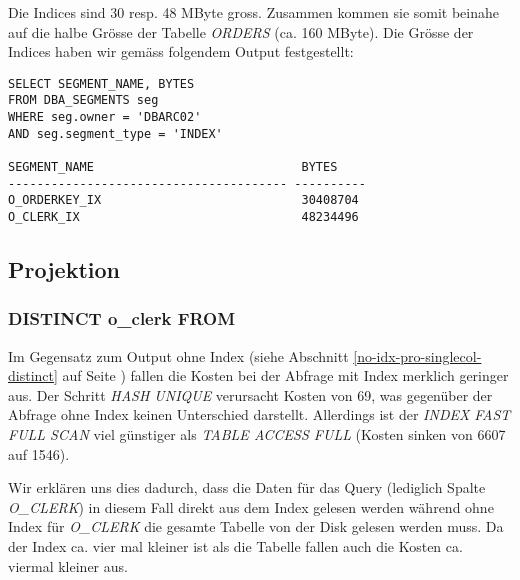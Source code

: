 \documentclass[11pt,a4paper,parskip=half]{scrartcl}
\begin{document}
Die Indices sind 30 resp. 48 MByte gross. Zusammen kommen sie somit beinahe auf die halbe Grösse der Tabelle \emph{ORDERS} (ca. 160 MByte). Die Grösse der Indices haben wir gemäss folgendem Output festgestellt:
\begin{lstlisting}
SELECT SEGMENT_NAME, BYTES
FROM DBA_SEGMENTS seg
WHERE seg.owner = 'DBARC02'
AND seg.segment_type = 'INDEX'

SEGMENT_NAME                             BYTES
--------------------------------------- ----------
O_ORDERKEY_IX                            30408704 
O_CLERK_IX                               48234496 
\end{lstlisting}

\subsection{Projektion}
\subsubsection{DISTINCT o\_clerk FROM}
\label{idx-pro-singlecol-distinct}
Im Gegensatz zum Output ohne Index (siehe Abschnitt \ref{no-idx-pro-singlecol-distinct} auf Seite \pageref{no-idx-pro-singlecol-distinct}) fallen die Kosten bei der Abfrage mit Index merklich geringer aus. Der Schritt \emph{HASH UNIQUE} verursacht Kosten von 69, was gegenüber der Abfrage ohne Index keinen Unterschied darstellt. Allerdings ist der \emph{INDEX FAST FULL SCAN} viel günstiger als \emph{TABLE ACCESS FULL} (Kosten sinken von 6607 auf 1546).

Wir erklären uns dies dadurch, dass die Daten für das Query (lediglich Spalte \emph{O\_CLERK}) in diesem Fall direkt aus dem Index gelesen werden während ohne Index für \emph{O\_CLERK} die gesamte Tabelle von der Disk gelesen werden muss. Da der Index ca. vier mal kleiner ist als die Tabelle fallen auch die Kosten ca. viermal kleiner aus.
\end{document}

